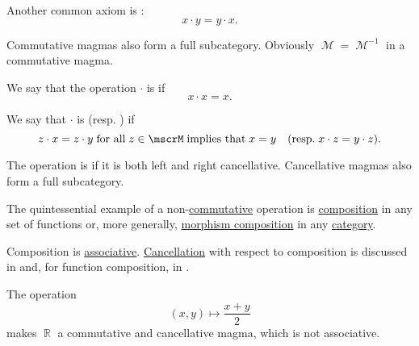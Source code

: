 \begin{definition}
\begin{thmenum}[resume=def:magma]
     Another common axiom is :
    \begin{equation}\label{eq:def:magma/commutative}
      x \cdot y = y \cdot x.
    \end{equation}

    Commutative magmas also form a full subcategory. Obviously \( \mscrM = \mscrM^{-1} \) in a commutative magma.

     We say that the operation \( \cdot \) is  if
    \begin{equation}\label{eq:def:magma/idempotent}
      x \cdot x = x.
    \end{equation}

     We say that \( \cdot \) is  (resp. ) if
    \begin{equation}\label{eq:def:magma/cancellative}
      z \cdot x = z \cdot y \T{for all} z \in \mscrM \T{implies that} x = y
      \quad
      (\T{resp.} x \cdot z = y \cdot z).
    \end{equation}

    The operation is  if it is both left and right cancellative. Cancellative magmas also form a full subcategory.
  \end{thmenum}
\end{definition}

\begin{example}\label{ex:def:magma}
  \hfill
  \begin{thmenum}
     The quintessential example of a non-\hyperref[def:magma/commutative]{commutative} operation is \hyperref[def:multi_valued_function/composition]{composition} in any set of functions or, more generally, \hyperref[def:category/composition]{morphism composition} in any \hyperref[def:category]{category}.

    Composition is \hyperref[def:magma/associative]{associative}. \hyperref[def:magma/cancellative]{Cancellation} with respect to composition is discussed in  and, for function composition, in .

     The operation
    \begin{equation*}
      (x, y) \mapsto \dfrac {x + y} 2
    \end{equation*}
    makes \( \BbbR \) a commutative and cancellative magma, which is not associative.
  \end{thmenum}
\end{example}

